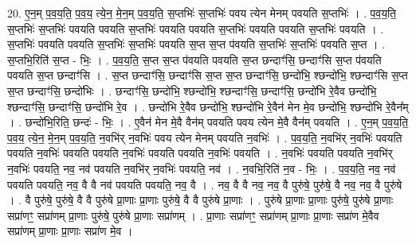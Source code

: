 \documentclass[17pt]{extarticle}
\begin{document}
20. ए॒न॒म् प॒व॒य॒ति॒ प॒व॒य॒ त्ये॒न॒ मे॒न॒म् प॒व॒य॒ति॒ स॒प्तभिः॑ स॒प्तभिः॑ पवय त्येन मेनम् पवयति स॒प्तभिः॑ । . प॒व॒य॒ति॒ स॒प्तभिः॑ स॒प्तभिः॑ पवयति पवयति स॒प्तभिः॑ पवयति पवयति स॒प्तभिः॑ पवयति पवयति स॒प्तभिः॑ पवयति । . स॒प्तभिः॑ पवयति पवयति स॒प्तभिः॑ स॒प्तभिः॑ पवयति स॒प्त स॒प्त प॑वयति स॒प्तभिः॑ स॒प्तभिः॑ पवयति स॒प्त । . स॒प्तभि॒रिति॑ स॒प्त - भिः॒ । . प॒व॒य॒ति॒ स॒प्त स॒प्त प॑वयति पवयति स॒प्त छन्दाꣳ॑सि॒ छन्दाꣳ॑सि स॒प्त प॑वयति पवयति स॒प्त छन्दाꣳ॑सि । . स॒प्त छन्दाꣳ॑सि॒ छन्दाꣳ॑सि स॒प्त स॒प्त छन्दाꣳ॑सि॒ छन्दो॑भि॒ श्छन्दो॑भि॒ श्छन्दाꣳ॑सि स॒प्त स॒प्त छन्दाꣳ॑सि॒ छन्दो॑भिः । . छन्दाꣳ॑सि॒ छन्दो॑भि॒ श्छन्दो॑भि॒ श्छन्दाꣳ॑सि॒ छन्दाꣳ॑सि॒ छन्दो॑भि रे॒वैव छन्दो॑भि॒ श्छन्दाꣳ॑सि॒ छन्दाꣳ॑सि॒ छन्दो॑भि रे॒व । . छन्दो॑भि रे॒वैव छन्दो॑भि॒ श्छन्दो॑भि रे॒वैन॑ मेन मे॒व छन्दो॑भि॒ श्छन्दो॑भि रे॒वैन᳚म् । . छन्दो॑भि॒रिति॒ छन्दः॑ - भिः॒ । . ए॒वैन॑ मेन मे॒वै वैन॑म् पवयति पवय त्येन मे॒वै वैन॑म् पवयति । . ए॒न॒म् प॒व॒य॒ति॒ प॒व॒य॒ त्ये॒न॒ मे॒न॒म् प॒व॒य॒ति॒ न॒वभि॑र् न॒वभिः॑ पवय त्येन मेनम् पवयति न॒वभिः॑ । . प॒व॒य॒ति॒ न॒वभि॑र् न॒वभिः॑ पवयति पवयति न॒वभिः॑ पवयति पवयति न॒वभिः॑ पवयति पवयति न॒वभिः॑ पवयति । . न॒वभिः॑ पवयति पवयति न॒वभि॑र् न॒वभिः॑ पवयति॒ नव॒ नव॑ पवयति न॒वभि॑र् न॒वभिः॑ पवयति॒ नव॑ । . न॒वभि॒रिति॑ न॒व - भिः॒ । . प॒व॒य॒ति॒ नव॒ नव॑ पवयति पवयति॒ नव॒ वै वै नव॑ पवयति पवयति॒ नव॒ वै । . नव॒ वै वै नव॒ नव॒ वै पुरु॑षे॒ पुरु॑षे॒ वै नव॒ नव॒ वै पुरु॑षे । . वै पुरु॑षे॒ पुरु॑षे॒ वै वै पुरु॑षे प्रा॒णाः प्रा॒णाः पुरु॑षे॒ वै वै पुरु॑षे प्रा॒णाः । . पुरु॑षे प्रा॒णाः प्रा॒णाः पुरु॑षे॒ पुरु॑षे प्रा॒णाः सप्रा॑णꣳ॒॒ सप्रा॑णम् प्रा॒णाः पुरु॑षे॒ पुरु॑षे प्रा॒णाः सप्रा॑णम् । . प्रा॒णाः सप्रा॑णꣳ॒॒ सप्रा॑णम् प्रा॒णाः प्रा॒णाः सप्रा॑ण मे॒वैव सप्रा॑णम् प्रा॒णाः प्रा॒णाः सप्रा॑ण मे॒व । \newline
\end{document}
